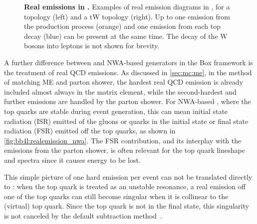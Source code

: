 \begin{figure}[th]
    \caption{\textbf{Real emissions in \bbfourl.} Examples of real emission diagrams in \bbfourl, for a \ttbar topology (left) and a tW topology (right). Up to one emission from the production process (orange) and one emission from each top decay (blue) can be present at the same time. The decay of the W bosons into leptons is not shown for brevity.}
    \label{fig:bb4l:realemission_bb4l}
\end{figure}

A further difference between \bbfourl and NWA-based \ttbar generators in the \powheg Box framework is the treatment of real QCD emissions. As discussed in \cref{sec:mc:me}, in the \powheg method of matching ME and parton shower, the hardest real QCD emission is already included almost always in the matrix element, while the second-hardest and further emissions are handled by the parton shower. For NWA-based \ttbar, where the top quarks are stable during event generation, this can mean initial state radiation (ISR) emitted of the gluons or quarks in the initial state or final state radiation (FSR) emitted off the top quarks, as shown in \cref{fig:bb4l:realemission_nwa}. The FSR contribution, and its interplay with the emissions from the parton shower, is often relevant for the top quark lineshape and \pt spectra since it causes energy to be lost.

This simple picture of one hard emission per event can not be translated directly to {\bbfourl}: when the top quark is treated as an unstable resonance, a real emission off one of the top quarks can still become singular when it is collinear to the (virtual) top quark. Since the top quark is not in the final state, this singularity is not canceled by the default \powheg subtraction method~\cite{Jezo:2015aia}.

